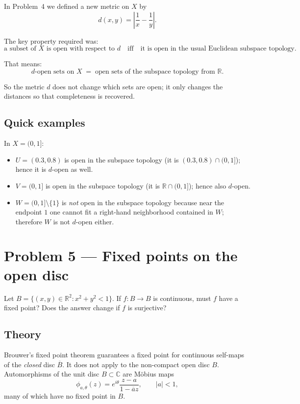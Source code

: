 \documentclass[12pt,a4paper]{article}
\theoremstyle{plain}
\theoremstyle{definition}
\theoremstyle{remark}
\theoremstyle{remark}
\begin{document}
\smallskip

In Problem~4 we defined a new metric on \(X\) by
\[
d(x,y)=\left|\frac{1}{x}-\frac{1}{y}\right|.
\]

The key property required was:
\[
\text{a subset of } X \text{ is open with respect to } d
\quad\text{iff}\quad
\text{it is open in the usual Euclidean subspace topology.}
\]

\smallskip

That means:
\[
\text{$d$-open sets on $X$} \;=\; \text{open sets of the subspace topology from $\mathbb{R}$.}
\]

So the metric \(d\) does not change which sets are open;
it only changes the distances so that completeness is recovered.

\medskip

\subsection*{Quick examples}


	In \(X=(0,1]\):
	\begin{itemize}
		\item \(U=(0.3,0.8)\) is open in the subspace topology
		(it is \((0.3,0.8)\cap(0,1]\)); hence it is $d$-open as well.
		\smallskip
		\item \(V=(0,1]\) is open in the subspace topology
		(it is \(\mathbb{R}\cap(0,1]\)); hence also $d$-open.
		\smallskip
		\item \(W=(0,1]\setminus\{1\}\) is \emph{not} open in the subspace topology
		because near the endpoint \(1\) one cannot fit a right-hand neighborhood
		contained in \(W\); therefore \(W\) is not $d$-open either.
	\end{itemize}

	
\section*{Problem 5 — Fixed points on the open disc}

Let \(B=\{(x,y)\in\mathbb{R}^2: x^2+y^2<1\}\).
If \(f:B\to B\) is continuous, must \(f\) have a fixed point?
Does the answer change if \(f\) is surjective?

\smallskip

\subsection*{Theory}

Brouwer's fixed point theorem guarantees a fixed point for continuous self-maps
of the \emph{closed} disc \(\overline{B}\).
It does not apply to the non-compact open disc \(B\).
Automorphisms of the unit disc \(B\subset\mathbb{C}\) are Möbius maps
\[
\phi_{a,\theta}(z)=e^{i\theta}\frac{z-a}{1-\overline{a}z},\qquad |a|<1,
\]
many of which have no fixed point in \(B\).
\end{document}
